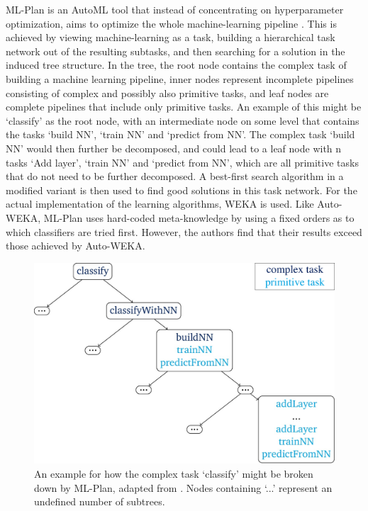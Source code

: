 ML-Plan is an AutoML tool that instead of concentrating on hyperparameter optimization, aims to optimize the whole machine-learning pipeline \cite{wever2017automatic}. This is achieved by viewing machine-learning as a task, building a hierarchical task network out of the resulting subtasks, and then searching for a solution in the induced tree structure. In the tree, the root node contains the complex task of building a machine learning pipeline, inner nodes represent incomplete pipelines consisting of complex and possibly also primitive tasks, and leaf nodes are complete pipelines that include only primitive tasks. An example of this might be `classify' as the root node, with an intermediate node on some level that contains the tasks `build NN', `train NN' and `predict from NN'. The complex task `build NN' would then further be decomposed, and could lead to a leaf node with n tasks `Add layer', `train NN' and `predict from NN', which are all primitive tasks that do not need to be further decomposed. A best-first search algorithm in a modified variant is then used to find good solutions in this task network. For the actual implementation of the learning algorithms, WEKA is used. Like Auto-WEKA, ML-Plan uses hard-coded meta-knowledge by using a fixed orders as to which classifiers are tried first. However, the authors find that their results exceed those achieved by Auto-WEKA.\\

\begin{figure}
\centering
\includegraphics[width=.8\textwidth]{gfx/MLPlan.pdf}
\caption{An example for how the complex task `classify' might be broken down by ML-Plan, adapted from \cite{wever2017automatic}. Nodes containing `...' represent an undefined number of subtrees.}
\label{fig:mltree}
\end{figure}


